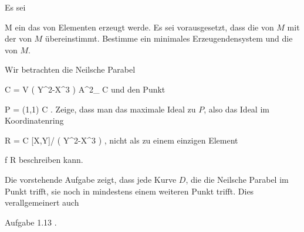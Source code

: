{}
{





Es sei

\mavergleichskette
{\vergleichskette
{ M
}
{ \subseteq }{ \N
}
{  }{
}
{    }{
}
{   }{
}
}
{}{}{}
ein
das von
Elementen erzeugt werde. Es sei vorausgesetzt, dass die
von $M$ mit der
von $M$ übereinstimmt. Bestimme ein minimales Erzeugendensystem und die
von $M$.





}
{} {}

{}
{





Wir betrachten die Neilsche Parabel

\mavergleichskettedisp
{\vergleichskette
{ C
}
{ =} { V \left(  Y^2-X^3  \right)
}
{ \subseteq} { {\mathbb A}^{2}_{ {\mathbb C} }
}
{ } {
}
{ } {
}
}
{}{}{}
und den Punkt

\mavergleichskettedisp
{\vergleichskette
{ P
}
{ =} { (1,1)
}
{ \in} { C
}
{ } {
}
{ } {
}
}
{}{}{.}
Zeige, dass man das maximale Ideal zu $P$, also das Ideal
 im Koordinatenring

\mavergleichskette
{\vergleichskette
{ R
}
{ = }{ {\mathbb C} [X,Y]/ \left(  Y^2-X^3  \right)
}
{  }{
}
{    }{
}
{   }{
}
}
{}{}{,}
nicht als
zu einem einzigen Element

\mavergleichskette
{\vergleichskette
{ f
}
{ \in }{ R
}
{  }{
}
{    }{
}
{   }{
}
}
{}{}{}
beschreiben kann.





}
{} {}

Die vorstehende Aufgabe zeigt, dass jede Kurve $D$, die die Neilsche Parabel im Punkt
 trifft, sie noch in mindestens einem weiteren Punkt trifft. Dies verallgemeinert auch

Aufgabe 1.13
.

